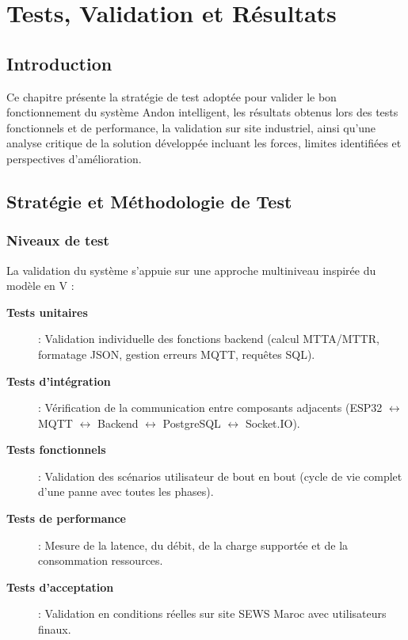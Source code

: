 ﻿%
\chapter{Tests, Validation et Résultats}

\section*{Introduction}

Ce chapitre présente la stratégie de test adoptée pour valider le bon fonctionnement du système Andon intelligent, les résultats obtenus lors des tests fonctionnels et de performance, la validation sur site industriel, ainsi qu'une analyse critique de la solution développée incluant les forces, limites identifiées et perspectives d'amélioration.

\section{Stratégie et Méthodologie de Test}

\subsection{Niveaux de test}

La validation du système s'appuie sur une approche multiniveau inspirée du modèle en V :

\begin{description}
    \item[\textbf{Tests unitaires}] : Validation individuelle des fonctions backend (calcul MTTA/MTTR, formatage JSON, gestion erreurs MQTT, requêtes SQL).
    \item[\textbf{Tests d'intégration}] : Vérification de la communication entre composants adjacents (ESP32 $\leftrightarrow$ MQTT $\leftrightarrow$ Backend $\leftrightarrow$ PostgreSQL $\leftrightarrow$ Socket.IO).
    \item[\textbf{Tests fonctionnels}] : Validation des scénarios utilisateur de bout en bout (cycle de vie complet d'une panne avec toutes les phases).
    \item[\textbf{Tests de performance}] : Mesure de la latence, du débit, de la charge supportée et de la consommation ressources.
    \item[\textbf{Tests d'acceptation}] : Validation en conditions réelles sur site SEWS Maroc avec utilisateurs finaux.
\end{description}

